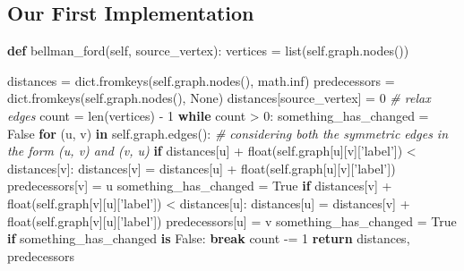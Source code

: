 \documentclass[11pt]{article}
\newenvironment{Shaded}{}{}
\newcommand{\KeywordTok}[1]{\textcolor[rgb]{0.00,0.44,0.13}{\textbf{{#1}}}}
\newcommand{\DecValTok}[1]{\textcolor[rgb]{0.25,0.63,0.44}{{#1}}}
\newcommand{\StringTok}[1]{\textcolor[rgb]{0.25,0.44,0.63}{{#1}}}
\newcommand{\CommentTok}[1]{\textcolor[rgb]{0.38,0.63,0.69}{\textit{{#1}}}}
\newcommand{\NormalTok}[1]{{#1}}
\newcommand{\VariableTok}[1]{\textcolor[rgb]{0.10,0.09,0.49}{{#1}}}
\newcommand{\ControlFlowTok}[1]{\textcolor[rgb]{0.00,0.44,0.13}{\textbf{{#1}}}}
\newcommand{\OperatorTok}[1]{\textcolor[rgb]{0.40,0.40,0.40}{{#1}}}
\newcommand{\BuiltInTok}[1]{{#1}}
\begin{document}
    \hypertarget{our-first-implementation}{%
\subsection{Our First Implementation}\label{our-first-implementation}}

\begin{Shaded}
\begin{Highlighting}[]
\KeywordTok{def}\NormalTok{ bellman_ford(}\VariableTok{self}\NormalTok{, source_vertex):}
\NormalTok{    vertices }\OperatorTok{=} \BuiltInTok{list}\NormalTok{(}\VariableTok{self}\NormalTok{.graph.nodes())}
    
\NormalTok{    distances }\OperatorTok{=} \BuiltInTok{dict}\NormalTok{.fromkeys(}\VariableTok{self}\NormalTok{.graph.nodes(), math.inf)}
\NormalTok{    predecessors }\OperatorTok{=} \BuiltInTok{dict}\NormalTok{.fromkeys(}\VariableTok{self}\NormalTok{.graph.nodes(), }\VariableTok{None}\NormalTok{)}
\NormalTok{    distances[source_vertex] }\OperatorTok{=} \DecValTok{0}
    \CommentTok{# relax edges}
\NormalTok{    count }\OperatorTok{=} \BuiltInTok{len}\NormalTok{(vertices) }\OperatorTok{-} \DecValTok{1}
    \ControlFlowTok{while}\NormalTok{ count }\OperatorTok{>} \DecValTok{0}\NormalTok{:}
\NormalTok{        something_has_changed }\OperatorTok{=} \VariableTok{False}
        \ControlFlowTok{for}\NormalTok{ (u, v) }\KeywordTok{in} \VariableTok{self}\NormalTok{.graph.edges():}
            \CommentTok{# considering both the symmetric edges in the form (u, v) and (v, u)}
            \ControlFlowTok{if}\NormalTok{ distances[u] }\OperatorTok{+} \BuiltInTok{float}\NormalTok{(}\VariableTok{self}\NormalTok{.graph[u][v][}\StringTok{'label'}\NormalTok{]) }\OperatorTok{<}\NormalTok{ distances[v]:}
\NormalTok{                distances[v] }\OperatorTok{=}\NormalTok{ distances[u] }\OperatorTok{+} \BuiltInTok{float}\NormalTok{(}\VariableTok{self}\NormalTok{.graph[u][v][}\StringTok{'label'}\NormalTok{])}
\NormalTok{                predecessors[v] }\OperatorTok{=}\NormalTok{ u}
\NormalTok{                something_has_changed }\OperatorTok{=} \VariableTok{True}
            \ControlFlowTok{if}\NormalTok{ distances[v] }\OperatorTok{+} \BuiltInTok{float}\NormalTok{(}\VariableTok{self}\NormalTok{.graph[v][u][}\StringTok{'label'}\NormalTok{]) }\OperatorTok{<}\NormalTok{ distances[u]:}
\NormalTok{                distances[u] }\OperatorTok{=}\NormalTok{ distances[v] }\OperatorTok{+} \BuiltInTok{float}\NormalTok{(}\VariableTok{self}\NormalTok{.graph[v][u][}\StringTok{'label'}\NormalTok{])}
\NormalTok{                predecessors[u] }\OperatorTok{=}\NormalTok{ v}
\NormalTok{                something_has_changed }\OperatorTok{=} \VariableTok{True}        
        \ControlFlowTok{if}\NormalTok{ something_has_changed }\KeywordTok{is} \VariableTok{False}\NormalTok{:}
            \ControlFlowTok{break}
\NormalTok{        count }\OperatorTok{-=} \DecValTok{1}
    \ControlFlowTok{return}\NormalTok{ distances, predecessors}
\end{Highlighting}
\end{Shaded}
\end{document}
